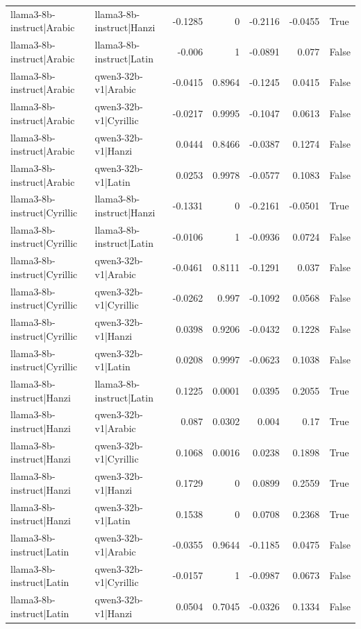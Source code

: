 \begin{table}
\begin{tabular}{l l r r r r l}
llama3-8b-instruct|Arabic & llama3-8b-instruct|Hanzi & -0.1285 & 0 & -0.2116 & -0.0455 & True \\
llama3-8b-instruct|Arabic & llama3-8b-instruct|Latin & -0.006 & 1 & -0.0891 & 0.077 & False \\
llama3-8b-instruct|Arabic & qwen3-32b-v1|Arabic & -0.0415 & 0.8964 & -0.1245 & 0.0415 & False \\
llama3-8b-instruct|Arabic & qwen3-32b-v1|Cyrillic & -0.0217 & 0.9995 & -0.1047 & 0.0613 & False \\
llama3-8b-instruct|Arabic & qwen3-32b-v1|Hanzi & 0.0444 & 0.8466 & -0.0387 & 0.1274 & False \\
llama3-8b-instruct|Arabic & qwen3-32b-v1|Latin & 0.0253 & 0.9978 & -0.0577 & 0.1083 & False \\
llama3-8b-instruct|Cyrillic & llama3-8b-instruct|Hanzi & -0.1331 & 0 & -0.2161 & -0.0501 & True \\
llama3-8b-instruct|Cyrillic & llama3-8b-instruct|Latin & -0.0106 & 1 & -0.0936 & 0.0724 & False \\
llama3-8b-instruct|Cyrillic & qwen3-32b-v1|Arabic & -0.0461 & 0.8111 & -0.1291 & 0.037 & False \\
llama3-8b-instruct|Cyrillic & qwen3-32b-v1|Cyrillic & -0.0262 & 0.997 & -0.1092 & 0.0568 & False \\
llama3-8b-instruct|Cyrillic & qwen3-32b-v1|Hanzi & 0.0398 & 0.9206 & -0.0432 & 0.1228 & False \\
llama3-8b-instruct|Cyrillic & qwen3-32b-v1|Latin & 0.0208 & 0.9997 & -0.0623 & 0.1038 & False \\
llama3-8b-instruct|Hanzi & llama3-8b-instruct|Latin & 0.1225 & 0.0001 & 0.0395 & 0.2055 & True \\
llama3-8b-instruct|Hanzi & qwen3-32b-v1|Arabic & 0.087 & 0.0302 & 0.004 & 0.17 & True \\
llama3-8b-instruct|Hanzi & qwen3-32b-v1|Cyrillic & 0.1068 & 0.0016 & 0.0238 & 0.1898 & True \\
llama3-8b-instruct|Hanzi & qwen3-32b-v1|Hanzi & 0.1729 & 0 & 0.0899 & 0.2559 & True \\
llama3-8b-instruct|Hanzi & qwen3-32b-v1|Latin & 0.1538 & 0 & 0.0708 & 0.2368 & True \\
llama3-8b-instruct|Latin & qwen3-32b-v1|Arabic & -0.0355 & 0.9644 & -0.1185 & 0.0475 & False \\
llama3-8b-instruct|Latin & qwen3-32b-v1|Cyrillic & -0.0157 & 1 & -0.0987 & 0.0673 & False \\
llama3-8b-instruct|Latin & qwen3-32b-v1|Hanzi & 0.0504 & 0.7045 & -0.0326 & 0.1334 & False \\

\end{tabular}
\end{table}
